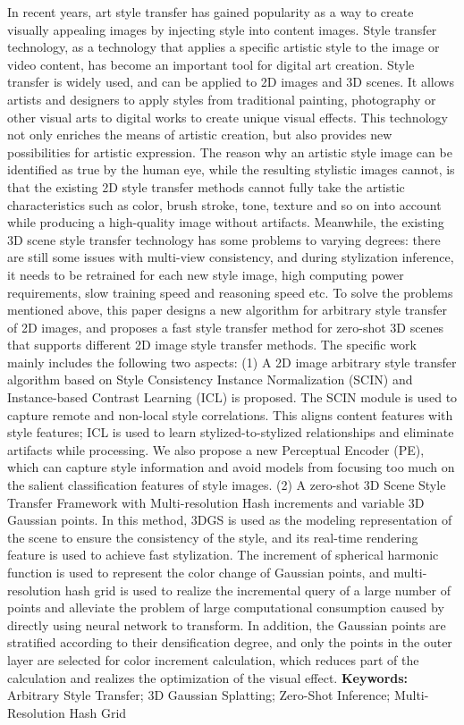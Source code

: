 \cleardoublepage
{}
In recent years, art style transfer has gained popularity as a way to create visually appealing images by injecting style into content images. Style transfer technology, as a technology that applies a specific artistic style to the image or video content, has become an important tool for digital art creation. Style transfer is widely used, and can be applied to 2D images and 3D scenes. It allows artists and designers to apply styles from traditional painting, photography or other visual arts to digital works to create unique visual effects. This technology not only enriches the means of artistic creation, but also provides new possibilities for artistic expression. The reason why an artistic style image can be identified as true by the human eye, while the resulting stylistic images cannot, is that the existing 2D style transfer methods cannot fully take the artistic characteristics such as color, brush stroke, tone, texture and so on into account while producing a high-quality image without artifacts. Meanwhile, the existing 3D scene style transfer technology has some problems to varying degrees: there are still some issues with multi-view consistency, and during stylization inference, it needs to be retrained for each new style image, high computing power requirements, slow training speed and reasoning speed etc. To solve the problems mentioned above, this paper designs a new algorithm for arbitrary style transfer of 2D images, and proposes a fast style transfer method for zero-shot 3D scenes that supports different 2D image style transfer methods. The specific work mainly includes the following two aspects:
\newline \indent(1) A 2D image arbitrary style transfer algorithm based on Style Consistency Instance Normalization (SCIN) and Instance-based Contrast Learning (ICL) is proposed. The SCIN module is used to capture remote and non-local style correlations. This aligns content features with style features; ICL is used to learn stylized-to-stylized relationships and eliminate artifacts while processing. We also propose a new Perceptual Encoder (PE), which can capture style information and avoid models from focusing too much on the salient classification features of style images.
\newline \indent(2) A zero-shot 3D Scene Style Transfer Framework with Multi-resolution Hash increments and variable 3D Gaussian points. In this method, 3DGS is used as the modeling representation of the scene to ensure the consistency of the style, and its real-time rendering feature is used to achieve fast stylization. The increment of spherical harmonic function is used to represent the color change of Gaussian points, and multi-resolution hash grid is used to realize the incremental query of a large number of points and alleviate the problem of large computational consumption caused by directly using neural network to transform. In addition, the Gaussian points are stratified according to their densification degree, and only the points in the outer layer are selected for color increment calculation, which reduces part of the calculation and realizes the optimization of the visual effect.
\newline
{\textbf{Keywords:}} 
Arbitrary Style Transfer; 3D Gaussian Splatting; Zero-Shot Inference; Multi-Resolution Hash Grid
